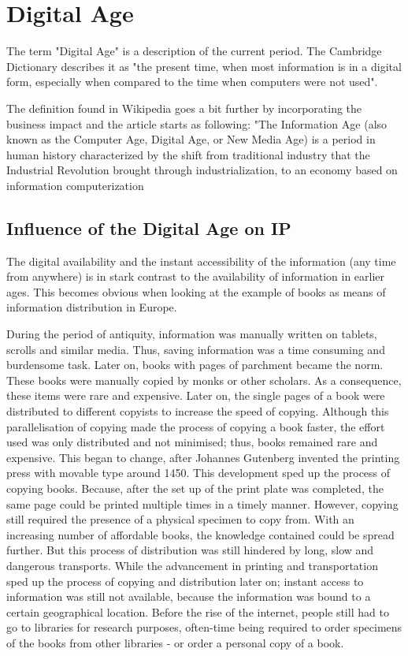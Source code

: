 \documentclass[a4paper]{report}
\begin{document}
\section{Digital Age}
\label{sec:Digital age}
The term "Digital Age" is a description of the current period. The Cambridge Dictionary describes it as "the present time, when most information is in a digital form, especially when compared to the time when computers were not used". \parencite{CambridgeUniversityPress2014}

The definition found in Wikipedia goes a bit further by incorporating the business impact and the article starts as following: "The Information Age (also known as the Computer Age, Digital Age, or New Media Age) is a period in human history characterized by the shift from traditional industry that the Industrial Revolution brought through industrialization, to an economy based on information computerization \parencite{WikiInfoAge2017}

\subsection{Influence of the Digital Age on IP}
The digital availability and the instant accessibility of the information (any time from anywhere) is in stark contrast to the availability of information in earlier ages. This becomes obvious when looking at the example of books as means of information distribution in Europe.

During the period of antiquity, information was manually written on tablets, scrolls and similar media. Thus, saving information was a time consuming and burdensome task.  Later on, books with pages of parchment became the norm. These books were manually copied by monks or other scholars. As a consequence, these items were rare and expensive. Later on, the single pages of a book were distributed to different copyists to increase the speed of copying. Although this parallelisation of copying made the process of copying a book faster, the effort used was only distributed and not minimised; thus, books remained rare and expensive. This began to change, after Johannes Gutenberg invented the printing press with movable type around 1450. This development sped up the process of copying books. Because, after the set up of the print plate was completed, the same page could be printed multiple times in a timely manner. However, copying still required the presence of a physical specimen to copy from. With an increasing number of affordable books, the knowledge contained could be spread further. But this process of distribution was still hindered by long, slow and dangerous transports. While the advancement in printing and transportation sped up the process of copying and distribution later on; instant access to information was still not available, because the information was bound to a certain geographical location. Before the rise of the internet, people still had to go to libraries for research purposes, often-time being required to order specimens of the books from other libraries - or order a personal copy of a book.
\end{document}
